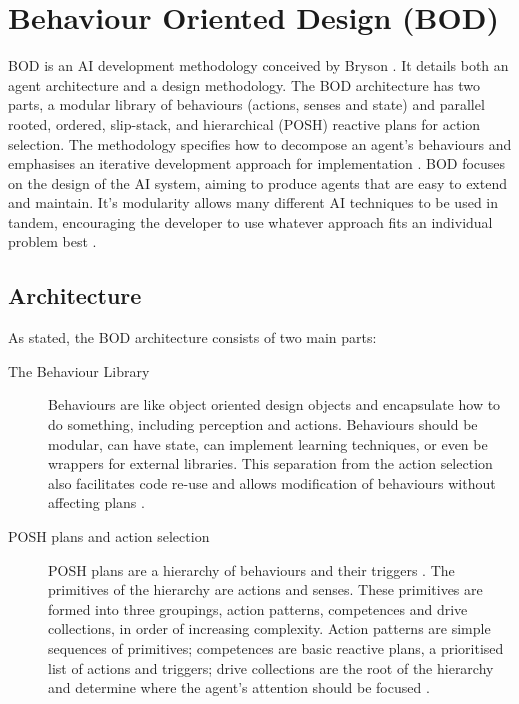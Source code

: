 \documentclass[11pt,openright,a4paper]{report}
\begin{document}
\section{Behaviour Oriented Design (BOD)}
\label{BOD}
BOD is an AI development methodology conceived by Bryson \cite{bryson2001intelligence}. It details both an agent architecture and a design methodology.  The BOD architecture has two parts, a modular library of behaviours (actions, senses and state) and parallel rooted, ordered, slip-stack,  and hierarchical (POSH) reactive plans for action selection. The methodology specifies how to decompose an agent's behaviours and emphasises an iterative development approach for implementation \cite{bryson2003behavior}. BOD focuses on the design of the AI system, aiming to produce agents that are easy to extend and maintain. It's modularity allows many different AI techniques to be used in tandem, encouraging the developer to use whatever approach fits an individual problem best \cite{gaudlbehaviour}.

\subsection{Architecture}
As stated,  the BOD architecture consists of two main parts:
\begin{description}
\item[The Behaviour Library] Behaviours are like object oriented design objects and encapsulate how to do something, including perception and actions. Behaviours should be modular, can have state, can implement learning techniques, or even be wrappers for external libraries. This separation from the action selection also facilitates code re-use and allows modification of behaviours without affecting plans \cite{gaudlbehaviour}.
\item[POSH plans and action selection] \label{POSHPlans}POSH plans are a hierarchy of behaviours and their triggers \cite{gaudlbehaviour}. The primitives of the hierarchy are actions and senses. These primitives are formed into three groupings, action patterns, competences and drive collections, in order of increasing complexity. Action patterns are simple sequences of primitives; competences are basic reactive plans, a prioritised list of actions and triggers; drive collections are the root of the hierarchy and determine where the agent's attention should be focused \cite{bryson2003behavior}.
\end{description}
\end{document}
